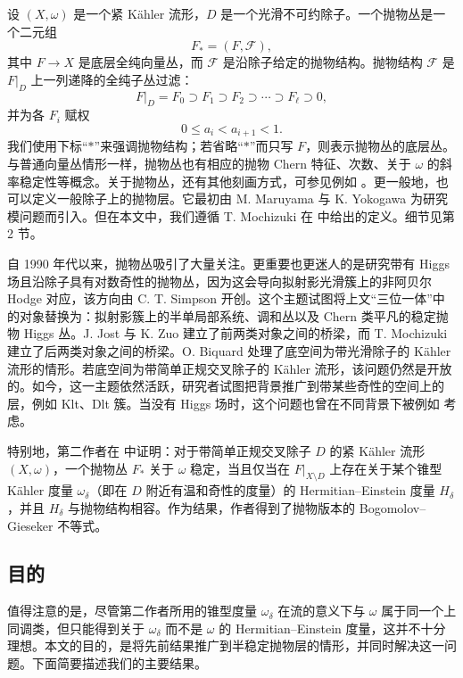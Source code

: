 \documentclass[12pt,a4paper]{article}
\begin{document}
设 \((X,\omega)\) 是一个紧 Kähler 流形，\(D\) 是一个光滑不可约除子。一个抛物丛是一个二元组
\[
F_*=(F,\mathcal F),
\]
其中 \(F\to X\) 是底层全纯向量丛，而 \(\mathcal F\) 是沿除子给定的抛物结构。抛物结构 \(\mathcal F\) 是 \(F|_D\) 上一列递降的全纯子丛过滤：
\[
F|_D = F_0 \supset F_1 \supset F_2 \supset \cdots \supset F_\ell \supset 0,
\]
并为各 \(F_i\) 赋权
\[
0\le a_i < a_{i+1} <1.
\]
我们使用下标“\(*\)”来强调抛物结构；若省略“\(*\)”而只写 \(F\)，则表示抛物丛的底层丛。与普通向量丛情形一样，抛物丛也有相应的抛物 Chern 特征、次数、关于 \(\omega\) 的斜率稳定性等概念。关于抛物丛，还有其他刻画方式，可参见例如 \cite{Biswas,IyerSimpson,Mochizuki2003}。更一般地，也可以定义一般除子上的抛物层。它最初由 M. Maruyama 与 K. Yokogawa \cite{MaruyamaYokogawa} 为研究模问题而引入。但在本文中，我们遵循 T. Mochizuki 在 \cite[Chapter 3]{MochizukiBook} 中给出的定义。细节见第 2 节。

自 1990 年代以来，抛物丛吸引了大量关注。更重要也更迷人的是研究带有 Higgs 场且沿除子具有对数奇性的抛物丛，因为这会导向拟射影光滑簇上的非阿贝尔 Hodge 对应，该方向由 C. T. Simpson \cite{SimpsonHarmonic} 开创。这个主题试图将上文“三位一体”中的对象替换为：拟射影簇上的半单局部系统、调和丛以及 Chern 类平凡的稳定抛物 Higgs 丛。J. Jost 与 K. Zuo \cite{JostZuo} 建立了前两类对象之间的桥梁，而 T. Mochizuki \cite{MochizukiBook} 建立了后两类对象之间的桥梁。O. Biquard \cite{BiquardLog} 处理了底空间为带光滑除子的 Kähler 流形的情形。若底空间为带简单正规交叉除子的 Kähler 流形，该问题仍然是开放的。如今，这一主题依然活跃，研究者试图把背景推广到带某些奇性的空间上的层，例如 Klt、Dlt 簇。当没有 Higgs 场时，这个问题也曾在不同背景下被例如 \cite{Li2000,LiNarasimhan,SteerWren} 考虑。

特别地，第二作者在 \cite{Li2000} 中证明：对于带简单正规交叉除子 \(D\) 的紧 Kähler 流形 \((X,\omega)\)，一个抛物丛 \(F_*\) 关于 \(\omega\) 稳定，当且仅当在 \(F|_{X\setminus D}\) 上存在关于某个锥型 Kähler 度量 \(\omega_\delta\)（即在 \(D\) 附近有温和奇性的度量）的 Hermitian--Einstein 度量 \(H_\delta\)，并且 \(H_\delta\) 与抛物结构相容。作为结果，作者得到了抛物版本的 Bogomolov--Gieseker 不等式。

\subsection{目的}

值得注意的是，尽管第二作者所用的锥型度量 \(\omega_\delta\) 在流的意义下与 \(\omega\) 属于同一个上同调类，但只能得到关于 \(\omega_\delta\) 而不是 \(\omega\) 的 Hermitian--Einstein 度量，这并不十分理想。本文的目的，是将先前结果推广到半稳定抛物层的情形，并同时解决这一问题。下面简要描述我们的主要结果。
\end{document}
